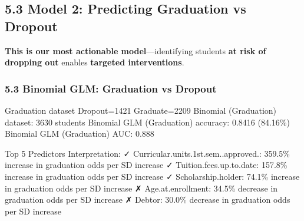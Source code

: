 \documentclass[
]{article}
\begin{document}
\subsection{5.3 Model 2: Predicting Graduation vs
Dropout}\label{model-2-predicting-graduation-vs-dropout}

\textbf{This is our most actionable model}---identifying students
\textbf{at risk of dropping out} enables \textbf{targeted
interventions}.

\subsubsection{5.3 Binomial GLM: Graduation vs
Dropout}\label{binomial-glm-graduation-vs-dropout}

Graduation dataset \textbar{} Dropout=1421 \textbar{} Graduate=2209
Binomial (Graduation) dataset: 3630 students Binomial GLM (Graduation)
accuracy: 0.8416 (84.16\%) Binomial GLM (Graduation) AUC: 0.888

Top 5 Predictors Interpretation: ✓ Curricular.units.1st.sem..approved.:
359.5\% increase in graduation odds per SD increase ✓
Tuition.fees.up.to.date: 157.8\% increase in graduation odds per SD
increase ✓ Scholarship.holder: 74.1\% increase in graduation odds per SD
increase ✗ Age.at.enrollment: 34.5\% decrease in graduation odds per SD
increase ✗ Debtor: 30.0\% decrease in graduation odds per SD increase
\end{document}
